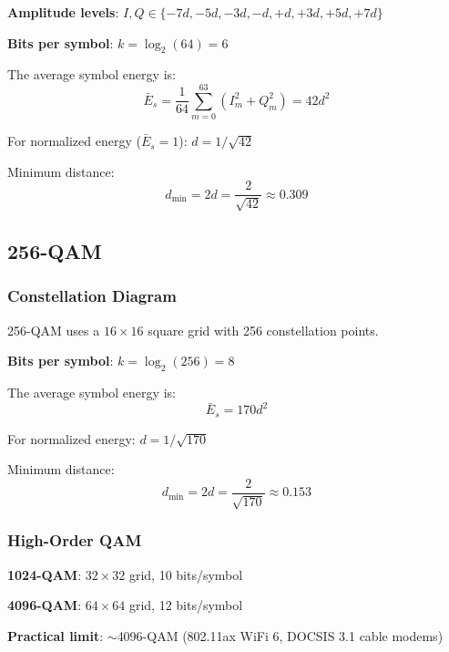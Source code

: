 \textbf{Amplitude levels}: $I, Q \in \{-7d, -5d, -3d, -d, +d, +3d, +5d, +7d\}$

\textbf{Bits per symbol}: $k = \log_2(64) = 6$

The average symbol energy is:
\begin{equation}
\bar{E}_s = \frac{1}{64}\sum_{m=0}^{63} (I_m^2 + Q_m^2) = 42d^2
\label{eq:64qam-energy}
\end{equation}

For normalized energy ($\bar{E}_s = 1$): $d = 1/\sqrt{42}$

Minimum distance:
\begin{equation}
d_{\min} = 2d = \frac{2}{\sqrt{42}} \approx 0.309
\label{eq:64qam-distance}
\end{equation}

\subsection{256-QAM}

\subsubsection{Constellation Diagram}

256-QAM uses a $16 \times 16$ square grid with 256 constellation points.

\textbf{Bits per symbol}: $k = \log_2(256) = 8$

The average symbol energy is:
\begin{equation}
\bar{E}_s = 170d^2
\label{eq:256qam-energy}
\end{equation}

For normalized energy: $d = 1/\sqrt{170}$

Minimum distance:
\begin{equation}
d_{\min} = 2d = \frac{2}{\sqrt{170}} \approx 0.153
\label{eq:256qam-distance}
\end{equation}

\subsubsection{High-Order QAM}

\textbf{1024-QAM}: $32 \times 32$ grid, 10 bits/symbol

\textbf{4096-QAM}: $64 \times 64$ grid, 12 bits/symbol

\textbf{Practical limit}: $\sim$4096-QAM (802.11ax WiFi 6, DOCSIS 3.1 cable modems)

